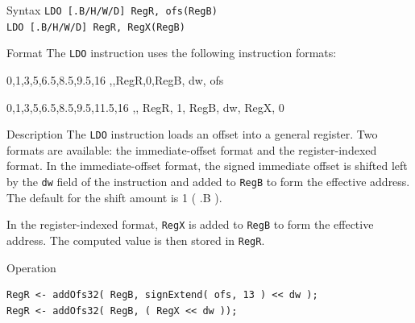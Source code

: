 %
%
\pagebreak
{}

\begin{iPageDescEntry}{Syntax}
\texttt{LDO [.B/H/W/D] RegR, ofs(RegB)} \\
\texttt{LDO [.B/H/W/D] RegR, RegX(RegB)}
\end{iPageDescEntry}

\begin{iPageDescEntry}{Format}
The \texttt{LDO} instruction uses the following instruction formats: \\

\begin{flushleft}
\drawInstrFormat
    {0,1,3,5,6.5,8.5,9.5,16}
    {\OpCodeGrpALU,\OpCodeLDO,RegR,0,RegB, dw, ofs}
\end{flushleft}

\begin{flushleft}
    \drawInstrFormat
        {0,1,3,5,6.5,8.5,9.5,11.5,16}
        {\OpCodeGrpALU,\OpCodeLDO, RegR, 1, RegB, dw, RegX, 0}
    \end{flushleft}
    
\end{iPageDescEntry}

\begin{iPageDescEntry}{Description}
The \texttt{LDO} instruction loads an offset into a general register. Two formats are available: the immediate-offset format and the register-indexed format. In the immediate-offset format, the signed immediate offset is shifted left by the \texttt{dw} field of the instruction and added to \texttt{RegB} to form the effective address. The default for the shift amount is 1 ( .B ).


In the register-indexed format, \texttt{RegX} is added to \texttt{RegB} to form the effective address. The computed value is then stored in \texttt{RegR}.

\end{iPageDescEntry}

\begin{iPageDescOpEntry}{Operation}
\begin{lstlisting}[style=iPageOpStyle]
RegR <- addOfs32( RegB, signExtend( ofs, 13 ) << dw );
RegR <- addOfs32( RegB, ( RegX << dw ));
\end{lstlisting}
\end{iPageDescOpEntry}

